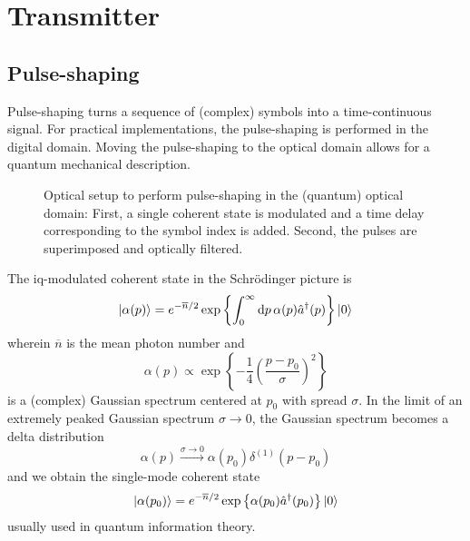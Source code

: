 \section{Transmitter}


\subsection{Pulse-shaping}

Pulse-shaping turns a sequence of (complex) symbols into a time-continuous signal.
For practical implementations, the pulse-shaping is performed in the digital domain.
Moving the pulse-shaping to the optical domain allows for a quantum mechanical description.
\begin{figure}[htb]
	\centering
    
    \caption{Optical setup to perform pulse-shaping in the (quantum) optical domain: First, a single coherent state is modulated and a time delay corresponding to the symbol index is added. Second, the pulses are superimposed and optically filtered.}
\end{figure}

The \gls{iq}-modulated coherent state in the Schrödinger picture is
\begin{equation}
	\ket{\alpha(p)}
	=
	e^{-\overline{n}/2}
	\exp\left\{
		\int_0^\infty\dd{p}
		\alpha(p)
		\hat{a}^\dagger(p)
	\right\}
	\ket{0}
\end{equation}
wherein $\overline{n}$ is the mean photon number and
\begin{equation}
	\alpha(p)
	\propto
	\exp\left\{
		-\frac{1}{4}\left(\frac{p-p_0}{\sigma}\right)^2
	\right\}
\end{equation}
is a (complex) Gaussian spectrum centered at $p_0$ with spread $\sigma$.
In the limit of an extremely peaked Gaussian spectrum $\sigma\to0$, the Gaussian spectrum becomes a delta distribution
\begin{equation}
	\alpha(p)
	\xrightarrow{\sigma\to0}
	\alpha(p_0)
	\delta^{(1)}(p-p_0)
\end{equation}
and we obtain the single-mode coherent state
\begin{equation}
	\ket{\alpha(p_0)}
	=
	e^{-\overline{n}/2}
	\exp\left\{
		\alpha(p_0)
		\hat{a}^\dagger(p_0)
	\right\}
	\ket{0}
\end{equation}
usually used in quantum information theory.

